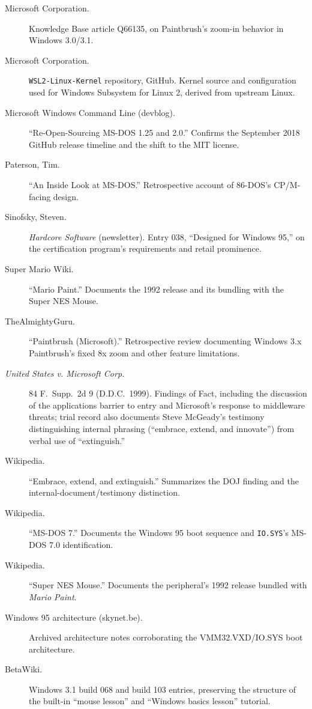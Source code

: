 \documentclass[11pt]{book}
\begin{document}
\begin{description}
\item[Microsoft Corporation.] Knowledge Base article Q66135, on Paintbrush's zoom-in behavior in Windows 3.0/3.1.

\item[Microsoft Corporation.] \texttt{WSL2-Linux-Kernel} repository, GitHub. Kernel source and configuration used for Windows Subsystem for Linux 2, derived from upstream Linux.

\item[Microsoft Windows Command Line (devblog).] \enquote{Re-Open-Sourcing MS-DOS 1.25 and 2.0.} Confirms the September 2018 GitHub release timeline and the shift to the MIT license.

\item[Paterson, Tim.] \enquote{An Inside Look at MS-DOS.} Retrospective account of 86-DOS's CP/M-facing design.

\item[Sinofsky, Steven.] \emph{Hardcore Software} (newsletter). Entry 038, \enquote{Designed for Windows 95,} on the certification program's requirements and retail prominence.

\item[Super Mario Wiki.] \enquote{Mario Paint.} Documents the 1992 release and its bundling with the Super NES Mouse.

\item[TheAlmightyGuru.] \enquote{Paintbrush (Microsoft).} Retrospective review documenting Windows 3.x Paintbrush's fixed 8x zoom and other feature limitations.

\item[\emph{United States v. Microsoft Corp.}] 84 F.\ Supp.\ 2d 9 (D.D.C.\ 1999). Findings of Fact, including the discussion of the applications barrier to entry and Microsoft's response to middleware threats; trial record also documents Steve McGeady's testimony distinguishing internal phrasing (\enquote{embrace, extend, and innovate}) from verbal use of \enquote{extinguish.}

\item[Wikipedia.] \enquote{Embrace, extend, and extinguish.} Summarizes the DOJ finding and the internal-document/testimony distinction.

\item[Wikipedia.] \enquote{MS-DOS 7.} Documents the Windows 95 boot sequence and \texttt{IO.SYS}'s MS-DOS 7.0 identification.

\item[Wikipedia.] \enquote{Super NES Mouse.} Documents the peripheral's 1992 release bundled with \emph{Mario Paint}.

\item[Windows 95 architecture (skynet.be).] Archived architecture notes corroborating the VMM32.VXD/IO.SYS boot architecture.

\item[BetaWiki.] Windows 3.1 build 068 and build 103 entries, preserving the structure of the built-in \enquote{mouse lesson} and \enquote{Windows basics lesson} tutorial.
\end{description}
\end{document}
